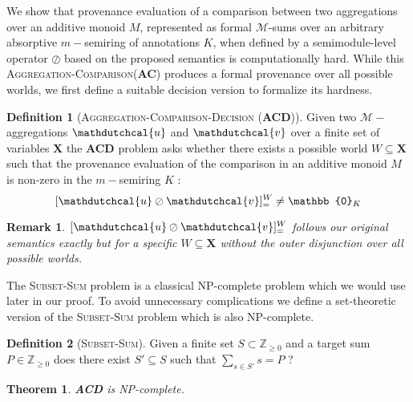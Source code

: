 \documentclass[10pt,a4paper]{scrartcl}
\newtheorem{theorem}{Theorem}[section]
\newtheorem*{remark}{Remark}
\theoremstyle{definition}
\newtheorem{definition}{Definition}[section]
\theoremstyle{remark}
\begin{document}
We show that provenance evaluation of a comparison between 
two aggregations over an additive monoid $M$, 
represented as formal $\mathcal{M}$-sums over an arbitrary 
absorptive $m-$semiring of annotations $K$, when defined by a
semimodule-level operator
$\oslash$ based on the proposed semantics is computationally hard.
While this \textsc{Aggregation-Comparison}(\textbf{AC}) produces 
a formal provenance over all possible worlds, we first define a 
suitable decision version to formalize its hardness. 
\begin{definition}[\textsc{Aggregation-Comparison-Decision} (\textbf{ACD})]
  Given two $\mathcal{M}-$aggregations $\mathdutchcal{u}$ and $\mathdutchcal{v}$ over a 
  finite set of variables $\mathbf{X}$
  the \textbf{ACD} problem asks whether there exists a possible world $W\subseteq\mathbf{X}$ such 
  that the provenance evaluation of the comparison in an additive monoid $M$ is non-zero in 
  the $m-$semiring $K$ :
\[
  [\mathdutchcal{u} \oslash \mathdutchcal{v}]_=^W\neq\mathbb{0}_{K}
  \]
\end{definition}
\begin{remark}
  $  [\mathdutchcal{u} \oslash \mathdutchcal{v}]_=^W$ follows our original semantics exactly but for a specific $W\subseteq\mathbf{X}$ without the outer disjunction over all possible worlds.
\end{remark}
The \textsc{Subset-Sum} problem is a classical NP-complete problem which we would use later in our proof. To avoid unnecessary complications we define a set-theoretic version of the \textsc{Subset-Sum} problem which is also NP-complete. 
\begin{definition}[\textsc{Subset-Sum}]
  Given a finite set $S\subset\mathbb{Z}_{\geq 0}$ and a target sum $P\in\mathbb{Z}_{\geq 0}$ does 
  there exist $S'\subseteq S$ such that $\sum_{s\in S'}s=P$ ?
\end{definition}
\begin{theorem}\label{th:ACD_NP}
  \textbf{ACD} is NP-complete.
\end{theorem}
\end{document}
